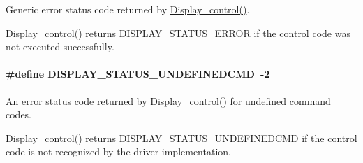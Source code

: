 Generic error status code returned by \hyperlink{_display_8h_ad623d21e3c6d821bf6f4bdcfa05ec21f}{Display\+\_\+control()}. 

\hyperlink{_display_8h_ad623d21e3c6d821bf6f4bdcfa05ec21f}{Display\+\_\+control()} returns D\+I\+S\+P\+L\+A\+Y\+\_\+\+S\+T\+A\+T\+U\+S\+\_\+\+E\+R\+R\+O\+R if the control code was not executed successfully. 
\paragraph[{D\+I\+S\+P\+L\+A\+Y\+\_\+\+S\+T\+A\+T\+U\+S\+\_\+\+U\+N\+D\+E\+F\+I\+N\+E\+D\+C\+M\+D}]{\setlength{\rightskip}{0pt plus 5cm}\#define D\+I\+S\+P\+L\+A\+Y\+\_\+\+S\+T\+A\+T\+U\+S\+\_\+\+U\+N\+D\+E\+F\+I\+N\+E\+D\+C\+M\+D~-\/2}\label{group___d_i_s_p_l_a_y___s_t_a_t_u_s_ga3e506301dbdad496a95e12c3b17efc6b}


An error status code returned by \hyperlink{_display_8h_ad623d21e3c6d821bf6f4bdcfa05ec21f}{Display\+\_\+control()} for undefined command codes. 

\hyperlink{_display_8h_ad623d21e3c6d821bf6f4bdcfa05ec21f}{Display\+\_\+control()} returns D\+I\+S\+P\+L\+A\+Y\+\_\+\+S\+T\+A\+T\+U\+S\+\_\+\+U\+N\+D\+E\+F\+I\+N\+E\+D\+C\+M\+D if the control code is not recognized by the driver implementation. 